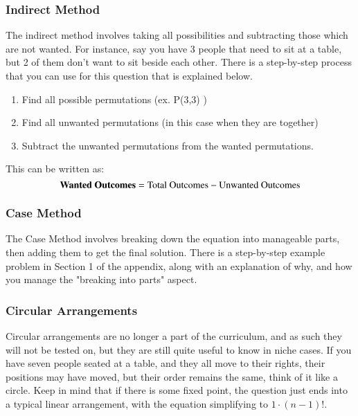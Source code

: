 \documentclass[final,1p,12pt]{elsarticle}
\begin{document}
        \subsubsection{Indirect Method}
        The indirect method involves taking all possibilities and subtracting those which are not wanted. For instance, say you have 3 people that need to sit at a table, but 2 of them don't want to sit beside each other. There is a step-by-step process that you can use for this question that is explained below.
        \begin{enumerate}
                \item Find all possible permutations (ex. P(3,3) )
                \item Find all unwanted permutations (in this case when they are together)
                \item Subtract the unwanted permutations from the wanted permutations.
            \end{enumerate}
        This can be written as:
        \begin{equation}
            \mbox{\textbf{Wanted Outcomes}} = \mbox{Total Outcomes}-\mbox{Unwanted Outcomes}
        \end{equation}
    
        \subsubsection{Case Method}
        The Case Method involves breaking down the equation into manageable parts, then adding them to get the final solution. There is a step-by-step example problem in Section 1 of the appendix, along with an explanation of why, and how you manage the "breaking into parts" aspect.

    \clearpage
    
        \subsubsection{Circular Arrangements}
        Circular arrangements are no longer a part of the curriculum, and as such they will not be tested on, but they are still quite useful to know in niche cases. If you have seven people seated at a table, and they all move to their rights, their positions may have moved, but their order remains the same, think of it like a circle. Keep in mind that if there is some fixed point, the question just ends into a typical linear arrangement, with the equation simplifying to $1 \cdot (n-1)!$.
        
\end{document}
